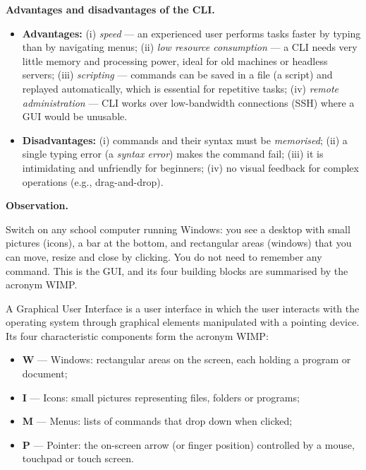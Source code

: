 \documentclass[11pt]{article}
\newcommand{\cle}[1]{{\popxbold\color{popdark}#1}}
\newcounter{popsec}
\newcounter{popsub}
\newcommand{\courssub}[1]{%
  \stepcounter{popsub}%
  \par\vspace{9pt}\noindent{\popxbold\fontsize{11.5}{13}\selectfont\color{popink}{\color{poporange}\thepopsec.\thepopsub}\hspace{6pt}#1}\par\nopagebreak\vspace{4pt}
}
\begin{document}
\textbf{Advantages and disadvantages of the CLI.}\par

\begin{propriete}
\begin{itemize}
\item \textbf{Advantages:} (i) \emph{speed} --- an experienced user performs tasks faster by typing than by navigating menus; (ii) \emph{low resource consumption} --- a CLI needs very little memory and processing power, ideal for old machines or headless servers; (iii) \emph{scripting} --- commands can be saved in a file (a \cle{script}) and replayed automatically, which is essential for repetitive tasks; (iv) \emph{remote administration} --- CLI works over low-bandwidth connections (SSH) where a GUI would be unusable.
\item \textbf{Disadvantages:} (i) commands and their syntax must be \emph{memorised}; (ii) a single typing error (a \emph{syntax error}) makes the command fail; (iii) it is intimidating and unfriendly for beginners; (iv) no visual feedback for complex operations (e.g., drag-and-drop).
\end{itemize}
\end{propriete}

\courssub{The Graphical User Interface (GUI)}

\textbf{Observation.}\par
Switch on any school computer running Windows: you see a desktop with small pictures (icons), a bar at the bottom, and rectangular areas (windows) that you can move, resize and close by clicking. You do not need to remember any command. This is the GUI, and its four building blocks are summarised by the acronym \cle{WIMP}.

\begin{definition}
A \cle{Graphical User Interface} is a user interface in which the user interacts with the operating system through graphical elements manipulated with a pointing device. Its four characteristic components form the acronym \cle{WIMP}:
\begin{itemize}
\item \textbf{W} --- \cle{Windows}: rectangular areas on the screen, each holding a program or document;
\item \textbf{I} --- \cle{Icons}: small pictures representing files, folders or programs;
\item \textbf{M} --- \cle{Menus}: lists of commands that drop down when clicked;
\item \textbf{P} --- \cle{Pointer}: the on-screen arrow (or finger position) controlled by a mouse, touchpad or touch screen.
\end{itemize}
\end{definition}
\end{document}
